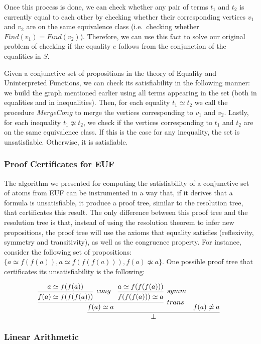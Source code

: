 Once this process is done, we can check whether any pair of terms $t_{1}$ and $t_{2}$ is currently equal to each other by checking whether their corresponding vertices $v_{1}$ and $v_{2}$ are on the same equivalence class (i.e.\ checking whether $Find(v_{1}) = Find(v_{2})$). Therefore, we can use this fact to solve our original problem of checking if the equality $e$ follows from the conjunction of the equalities in $S$.

Given a conjunctive set of propositions in the theory of Equality and Uninterpreted Functions, we can check
its satisfiability in the following manner: we build the graph mentioned earlier using
all terms appearing in the set (both in equalities and in inequalities). Then, for
each equality $t_{1} \simeq t_{2}$ we call the procedure $MergeCong$ to merge the vertices corresponding to $v_{1}$ and $v_{2}$.
Lastly, for each inequality $t_{1} \not\simeq t_{2}$, we check if the vertices corresponding to $t_{1}$ and $t_{2}$ are on the same equivalence class. If this is the case for any inequality, the set is unsatisfiable. Otherwise, it is satisfiable.

\subsubsection{Proof Certificates for EUF}

The algorithm we presented for computing the satisfiability of a conjunctive set of
atoms from EUF can be instrumented in a way that, if it derives that a formula is
unsatisfiable, it produce a proof tree, similar to the resolution tree, that
certificates this result.
The only difference between this proof tree and the resolution tree is that, instead of using the resolution theorem to infer new propositions, the proof tree will use the axioms that equality satisfies (reflexivity, symmetry and transitivity), as well as the congruence property. For instance, consider the following set of propositions: $\{a \simeq f(f(a)), a \simeq f(f(f(a))), f(a) \not\simeq a\}$. One possible proof tree that certificates its unsatisfiability is the following:

\[
  \infer[]{\bot}{\infer[trans]{f(a) \simeq a}{\infer[cong]{f(a) \simeq f(f(f(a)))}{a \simeq f(f(a))} & \infer[symm]{f(f(f(a))) \simeq a}{a \simeq f(f(f(a)))}} & f(a) \not\simeq a}
\]

\subsubsection{Linear Arithmetic}

